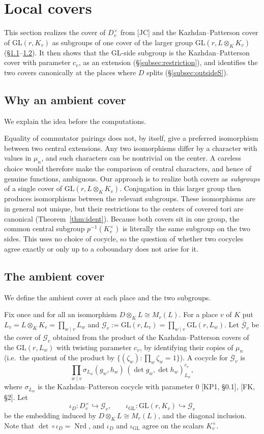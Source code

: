 \documentclass[12pt]{article}
\newcommand{\ov}[1]{\overline{#1}}
\newcommand{\Nrd}{\operatorname{Nrd}}
\newcommand{\GL}{\mathrm{GL}}
\newcommand{\cG}{\mathcal{G}}
\newcommand{\cGb}{\ov{\mathcal{G}}}
\newcommand{\iD}{\iota_D}
\newcommand{\iG}{\iota_{\GL}}
\theoremstyle{plain}
\theoremstyle{definition}
\begin{document}
\section{Local covers}\label{sec:covers}
This section realizes the cover of $D_v^\times$ from [JC] and the Kazhdan--Patterson cover of $\GL(r,K_v)$ as subgroups of one cover of the larger group $\GL(r,L\otimes_KK_v)$ (\S\ref{subsec:why}--\ref{subsec:ambient}). It then shows that the $\GL$-side subgroup is the Kazhdan--Patterson cover with parameter $c_v$, as an extension (\S\ref{subsec:restriction}), and identifies the two covers canonically at the places where $D$ splits (\S\ref{subsec:outsideS}).

\subsection{Why an ambient cover}\label{subsec:why}
We explain the idea before the computations.

Equality of commutator pairings does not, by itself, give a preferred isomorphism between two central extensions. Any two isomorphisms differ by a character with values in $\mu_n$, and such characters can be nontrivial on the center. A careless choice would therefore make the comparison of central characters, and hence of genuine functions, ambiguous. Our approach is to realize both covers as \emph{subgroups} of a single cover of $\GL(r,L\otimes_KK_v)$. Conjugation in this larger group then produces isomorphisms between the relevant subgroups. These isomorphisms are in general not unique, but their restrictions to the centers of covered tori are canonical (Theorem~\ref{thm:ident}). Because both covers sit in one group, the common central subgroup $p^{-1}(K_v^\times)$ is literally the same subgroup on the two sides. This uses no choice of cocycle, so the question of whether two cocycles agree exactly or only up to a coboundary does not arise for it.

\subsection{The ambient cover}\label{subsec:ambient}
We define the ambient cover at each place and the two subgroups.

Fix once and for all an isomorphism $D\otimes_KL\cong M_r(L)$. For a place $v$ of $K$ put $L_v=L\otimes_KK_v=\prod_{w\mid v}L_w$ and $\cG_v:=\GL(r,L_v)=\prod_{w\mid v}\GL(r,L_w)$. Let $\cGb_v$ be the cover of $\cG_v$ obtained from the product of the Kazhdan--Patterson covers of the $\GL(r,L_w)$ with twisting parameter $c_v$, by identifying their copies of $\mu_n$ (i.e.\ the quotient of the product by $\{(\zeta_w):\prod_w\zeta_w=1\}$). A cocycle for $\cGb_v$ is
\begin{equation}\label{eq:ambient}
\prod_{w\mid v}\sigma_{L_w}(g_w,h_w)\,(\det g_w,\det h_w)_{L_w}^{c_v},
\end{equation}
where $\sigma_{L_w}$ is the Kazhdan--Patterson cocycle with parameter $0$ [KP1, \S0.1], [FK, \S2]. Let
\[ \iD:D_v^\times\hookrightarrow\cG_v,\qquad \iG:\GL(r,K_v)\hookrightarrow\cG_v \]
be the embedding induced by $D\otimes_KL\cong M_r(L)$, and the diagonal inclusion. Note that $\det\circ\iD=\Nrd$, and $\iD$ and $\iG$ agree on the scalars $K_v^\times$.
\end{document}
